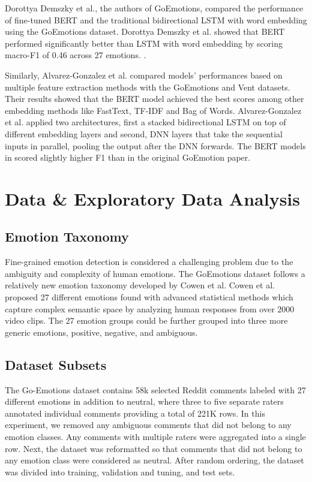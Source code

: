 \documentclass[conference]{IEEEtran}
\begin{document}
Dorottya Demszky et al.\cite{DBLP:journals/corr/abs-2005-00547}, the authors of GoEmotions, compared the performance of fine-tuned BERT and the traditional bidirectional LSTM\cite{https://www.researchgate.net/publication/13853244_Long_Short-term_Memory} with word embedding using the GoEmotions dataset. Dorottya Demszky et al. showed that BERT performed significantly better than LSTM with word embedding by scoring macro-F1 of 0.46 across 27 emotions. . 

Similarly, Alvarez-Gonzalez et al.\cite{https://doi.org/10.48550/arxiv.2109.01900} compared models' performances based on multiple feature extraction methods with the GoEmotions\cite{DBLP:journals/corr/abs-2005-00547} and Vent\cite{DBLP:journals/corr/abs-1901-04856} datasets. Their results showed that the BERT model achieved the best scores among other embedding methods like FastText\cite{DBLP:journals/corr/JoulinGBM16}, TF-IDF and Bag of Words. Alvarez-Gonzalez et al. applied two architectures, first a stacked bidirectional LSTM on top of different embedding layers and second, DNN layers that take the sequential inputs in parallel, pooling the output after the DNN forwards. The BERT models in \cite{https://doi.org/10.48550/arxiv.2109.01900} scored slightly higher F1 than in the original GoEmotion paper\cite{DBLP:journals/corr/abs-2005-00547}. 

\section{Data \& Exploratory Data Analysis}
\subsection{Emotion Taxonomy}
Fine-grained emotion detection is considered a challenging problem due to the ambiguity and complexity of human emotions. The GoEmotions dataset follows a relatively new emotion taxonomy developed by Cowen et al. \cite{DOI:10.1109/IEC47844.2019.8950616} Cowen et al. proposed 27 different emotions found with advanced statistical methods which capture complex semantic space by analyzing human responses from over 2000 video clips. The 27 emotion groups could be further grouped into three more generic emotions, positive, negative, and ambiguous\cite{DBLP:journals/corr/abs-2005-00547}. 

\subsection{Dataset Subsets}
 The Go-Emotions dataset contains 58k selected Reddit comments labeled with 27 different emotions in addition to neutral, where three to five separate raters annotated individual comments providing a total of 221K rows\cite{DBLP:journals/corr/abs-2005-00547}. In this experiment, we removed any ambiguous comments that did not belong to any emotion classes. Any comments with multiple raters were aggregated into a single row. Next, the dataset was reformatted so that comments that did not belong to any emotion class were considered as neutral. After random ordering, the dataset was divided into training, validation and tuning, and test sets. 
\end{document}
